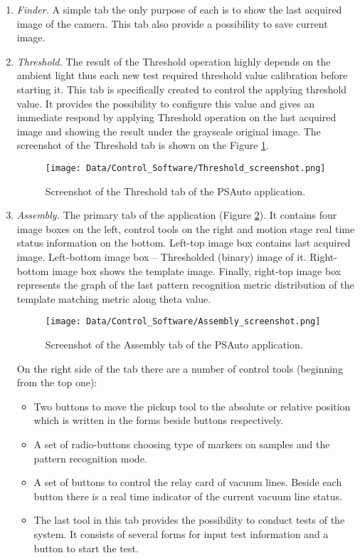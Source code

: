 \begin{enumerate}

\item \emph{Finder.} A simple tab the only purpose of each is to show the last acquired image of the camera. This tab also provide a possibility to save current image.

\item \emph{Threshold.} The result of the Threshold operation highly depends on the ambient light thus each new test required threshold value calibration before starting it. This tab is specifically created to control the applying threshold value. It provides the possibility to configure this value and gives an immediate respond by applying Threshold operation on the last acquired image and showing the result under the grayscale original image. The screenshot of the Threshold tab is shown on the Figure \ref{fig:threshold_screenshot}.

\begin{figure}[ht]\centering
\texttt{[image: Data/Control\_Software/Threshold\_screenshot.png]}
\caption{Screenshot of the Threshold tab of the PSAuto application.}
\label{fig:threshold_screenshot}
\end{figure}

\item \emph{Assembly.} The primary tab of the application (Figure \ref{fig:assembly_screenshot}). It contains four image boxes on the left, control tools on the right and motion stage real time status information on the bottom. Left-top image box contains last acquired image. Left-bottom image box -- Thresholded (binary) image of it. Right-bottom image box shows the template image. Finally, right-top image box represents the graph of the last pattern recognition metric distribution of the template matching metric along theta value.

\begin{figure}[ht]\centering
\texttt{[image: Data/Control\_Software/Assembly\_screenshot.png]}
\caption{Screenshot of the Assembly tab of the PSAuto application.}
\label{fig:assembly_screenshot}
\end{figure}

On the right side of the tab there are a number of control tools (beginning from the top one):

\begin{itemize}
\setlength\itemsep{-0.5em}
\item Two buttons to move the pickup tool to the absolute or relative position which is written in the forms beside buttons respectively.
\item A set of radio-buttons choosing type of markers on samples and the pattern recognition mode.
\item A set of buttons to control the relay card of vacuum lines. Beside each button there is a real time indicator of the current vacuum line status.
\item The last tool in this tab provides the possibility to conduct tests of the system. It consists of several forms for input test information and a button to start the test.
\end{itemize}


\end{enumerate}
